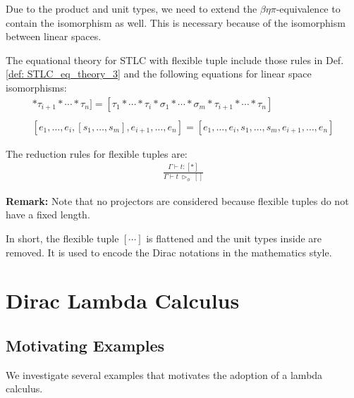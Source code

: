 Due to the product and unit types, we need to extend the $\beta\eta\pi$-equivalence to contain the isomorphism as well. This is necessary because of the isomorphism between linear spaces.

\begin{definition}
  \label{def: STLC_flexible_eq_theory_3}
  The equational theory for STLC with flexible tuple include those rules in Def.\ref{def: STLC_eq_theory_3} and the following equations for linear space isomorphisms:
  \begin{gather*}
    [\tau_1 * \cdots * \tau_i * [\sigma_1 * \cdots * \sigma_m] * \tau_{i+1} * \cdots * \tau_n] = [\tau_1 * \cdots * \tau_i * \sigma_1 * \cdots * \sigma_m * \tau_{i+1} * \cdots * \tau_n]\\
    \ \\      
    [e_1, \dots, e_i, [s_1, \dots, s_m], e_{i+1}, \dots, e_n] = [e_1, \dots, e_i, s_1, \dots, s_m, e_{i+1}, \dots, e_n]
  \end{gather*}

\end{definition}

\begin{definition}
  \label{def:STLC_flexible_tuple_red_3}
   The reduction rules for flexible tuples are:
  \begin{gather*}
      \frac{\Gamma \vdash t : [*]}{\Gamma \vdash t\ \triangleright_\phi\ []}
  \end{gather*}
\end{definition}

\textbf{Remark:} Note that no projectors are considered because flexible tuples do not have a fixed length.

In short, the flexible tuple $[\cdots]$ is flattened and the unit types inside are removed. It is used to encode the Dirac notations in the mathematics style.


\section{Dirac Lambda Calculus}



\subsection{Motivating Examples}
We investigate several examples that motivates the adoption of a lambda calculus.

